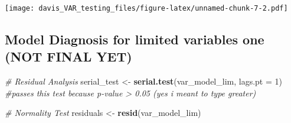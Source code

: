 \documentclass[
]{article}
\newenvironment{Shaded}{\begin{snugshade}}{\end{snugshade}}
\newcommand{\AttributeTok}[1]{\textcolor[rgb]{0.13,0.29,0.53}{#1}}
\newcommand{\CommentTok}[1]{\textcolor[rgb]{0.56,0.35,0.01}{\textit{#1}}}
\newcommand{\DecValTok}[1]{\textcolor[rgb]{0.00,0.00,0.81}{#1}}
\newcommand{\FunctionTok}[1]{\textcolor[rgb]{0.13,0.29,0.53}{\textbf{#1}}}
\newcommand{\NormalTok}[1]{#1}
\newcommand{\OtherTok}[1]{\textcolor[rgb]{0.56,0.35,0.01}{#1}}
\begin{document}
\texttt{[image: davis\_VAR\_testing\_files/figure-latex/unnamed-chunk-7-2.pdf]}

\hypertarget{model-diagnosis-for-limited-variables-one-not-final-yet}{%
\subsection{Model Diagnosis for limited variables one (NOT FINAL
YET)}\label{model-diagnosis-for-limited-variables-one-not-final-yet}}

\begin{Shaded}
\begin{Highlighting}[]
\CommentTok{\# Residual Analysis}
\NormalTok{serial\_test }\OtherTok{\textless{}{-}} \FunctionTok{serial.test}\NormalTok{(var\_model\_lim, }\AttributeTok{lags.pt =} \DecValTok{1}\NormalTok{) }\CommentTok{\#passes this test because p{-}value \textgreater{} 0.05 (yes i meant to type greater)}

\CommentTok{\# Normality Test}
\NormalTok{residuals }\OtherTok{\textless{}{-}} \FunctionTok{resid}\NormalTok{(var\_model\_lim)}


\end{Highlighting}
\end{Shaded}
\end{document}
